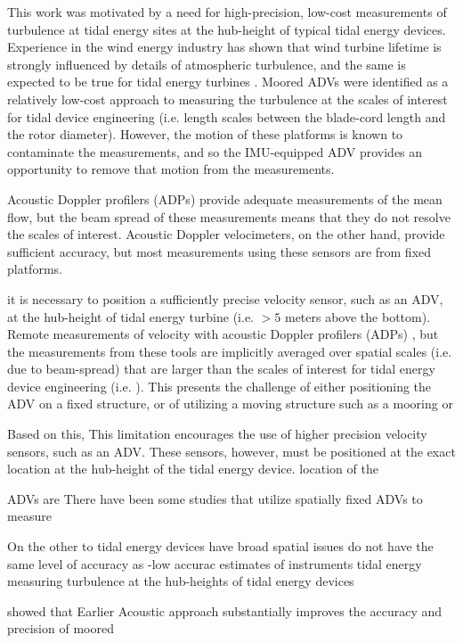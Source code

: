 This work was motivated by a need for high-precision, low-cost measurements of turbulence at tidal energy sites at the hub-height of typical tidal energy devices.  Experience in the wind energy industry has shown that wind turbine lifetime is strongly influenced by details of atmospheric turbulence, and the same is expected to be true for tidal energy turbines \cite[]{Hand++2003, Kelley++2005, Mucke++2011, Afgan++2013, Mccaffrey++2015, Alexander+Hamlington2015}.  Moored ADVs were identified as a relatively low-cost approach to measuring the turbulence at the scales of interest for tidal device engineering (i.e. length scales between the blade-cord length and the rotor diameter). However, the motion of these platforms is known to contaminate the measurements, and so the IMU-equipped ADV provides an opportunity to remove that motion from the measurements.

Acoustic Doppler profilers (ADPs) provide adequate measurements of the mean flow, but the beam spread of these measurements means that they do not resolve the scales of interest. Acoustic Doppler velocimeters, on the other hand, provide sufficient accuracy, but most measurements using these sensors are from fixed platforms. 

it is necessary to position a sufficiently precise velocity sensor, such as an ADV, at the hub-height of tidal energy turbine (i.e. $>5$ meters above the bottom). 
Remote measurements of velocity with acoustic Doppler profilers (ADPs) , but the measurements from these tools are implicitly averaged over spatial scales (i.e. due to beam-spread) that are larger than the scales of interest for tidal energy device engineering (i.e. ). This presents the challenge of either positioning the ADV on a fixed structure, or of utilizing a moving structure such as a mooring or 


Based on this, This limitation encourages the use of higher precision velocity sensors, such as an ADV. These sensors, however, must be positioned at the exact location  at the hub-height of the tidal energy device.  location of the 

ADVs are There have been some  studies that utilize spatially fixed ADVs to measure 

On the other to tidal energy devices have broad spatial  issues do not have the same level of accuracy as -low accurac estimates of instruments tidal energy measuring turbulence at the hub-heights of tidal energy devices

showed that Earlier Acoustic approach substantially improves the accuracy and precision of moored 

